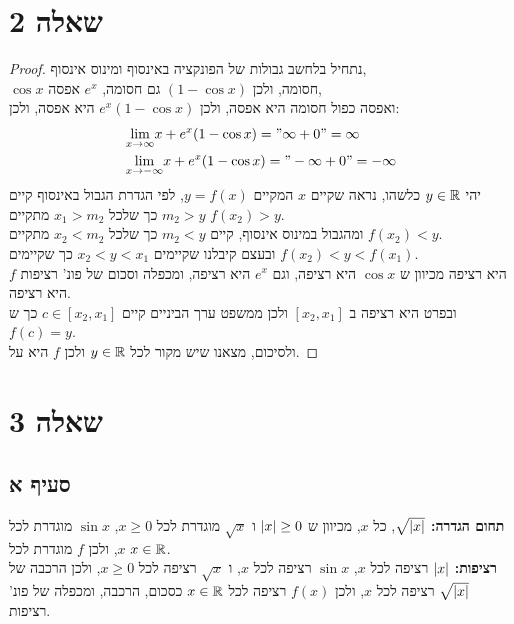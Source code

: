 \documentclass{article}
\begin{document}
	\section*{שאלה 2}
	\begin{proof}
		נתחיל בלחשב גבולות של הפונקציה באינסוף ומינוס אינסוף, \\
		$\cos x$ חסומה, ולכן $(1 - \cos x)$ גם חסומה, $e^x$ אפסה,\\
		 ואפסה כפול חסומה היא אפסה, ולכן $e^x(1 - \cos x)$ היא אפסה, ולכן:
		\begin{align*}
			&\displaystyle{\lim_{x \to \infty}} x + e^x(1- \cos x) = "\infty + 0" = \infty  \\
			&\displaystyle{\lim_{x \to -\infty}} x + e^x(1- \cos x) = "-\infty + 0" = -\infty  \\
		\end{align*}
		יהי $y \in \mathbb{R}$ כלשהו, נראה שקיים $x$ המקיים $y = f(x)$,
		לפי הגדרת הגבול באינסוף קיים $m_2 > y$ כך שלכל $x_1 > m_2$ מתקיים $f(x_2) > y$. \\
		ומהגבול במינוס אינסוף, קיים $m_2 < y$ כך שלכל $x_2 < m_2$ מתקיים $f(x_2) < y$. \\
		ובעצם קיבלנו שקיימים $x_2 < y < x_1$ כך שקיימים $f(x_2) < y < f(x_1)$. \\
		$f$ היא רציפה מכיוון ש $\cos x$ היא רציפה, וגם $e^x$ היא רציפה, ומכפלה וסכום של פונ' רציפות היא רציפה. \\
		ובפרט היא רציפה ב $[x_2, x_1]$ ולכן ממשפט ערך הביניים קיים $c \in [x_2, x_1]$ כך ש $f(c) = y$. \\
		ולסיכום, מצאנו שיש מקור לכל $y \in \mathbb{R}$ ולכן $f$ היא על.
	\end{proof}

	\pagebreak

	\section*{שאלה 3}
	\subsection*{סעיף א}
	\textbf{תחום הגדרה:} $\sqrt{\left| x \right|}$, כל $x$, מכיוון ש $\left| x \right| \geq 0$ ו $\sqrt{x}$ מוגדרת לכל $x \geq 0$,
	$\sin x$ מוגדרת לכל $x$, ולכן $f$ מוגדרת לכל $x \in \mathbb{R}$. \\
	\textbf{רציפות:} $\left| x \right|$ רציפה לכל $x$, $\sin x$ רציפה לכל $x$, ו $\sqrt{x}$ רציפה לכל $x \geq 0$,
	ולכן הרכבה של $\sqrt{\left| x \right|}$ רציפה לכל $x$,
	ולכן $f(x)$ רציפה לכל $x \in \mathbb{R}$ כסכום, הרכבה, ומכפלה של פונ' רציפות. \\
\end{document}
